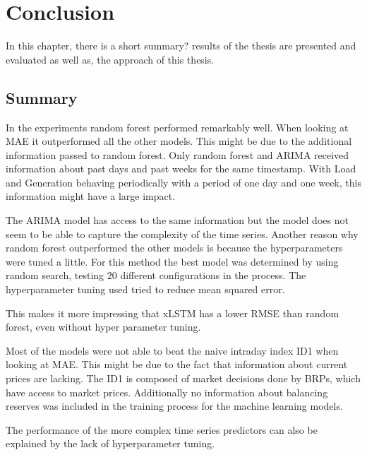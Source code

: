 \documentclass[class=scrbook, crop=false]{standalone}
\begin{document}
\chapter{Conclusion} %
\label{Chapter::Conclusion}

    In this chapter, there is a short summary? results of the thesis are presented and evaluated as well as, the approach of this thesis.

\section{Summary}
\label{Section::Summary}

In the experiments random forest performed remarkably well. 
When looking at MAE it outperformed all the other models. 
This might be due to the additional information passed to random forest. 
Only random forest and ARIMA received information about past days and past weeks for the same timestamp. 
With Load and Generation behaving periodically with a period of one day and one week, this information might have a large impact.

The ARIMA model has access to the same information but the model does not seem to be able to capture the complexity of the time series.
Another reason why random forest outperformed the other models is because the hyperparameters were tuned a little. 
For this method the best model was determined by using random search, testing 20 different configurations in the process.
The hyperparameter tuning used tried to reduce mean squared error.

This makes it more impressing that xLSTM has a lower RMSE than random forest, even without hyper parameter tuning.

Most of the models were not able to beat the naive intraday index ID1 when looking at MAE. 
This might be due to the fact that information about current prices are lacking. 
The ID1 is composed of market decisions done by BRPs, which have access to market prices.
Additionally no information about balancing reserves was included in the training process for the machine learning models.

The performance of the more complex time series predictors can also be explained by the lack of hyperparameter tuning. 
\end{document}

